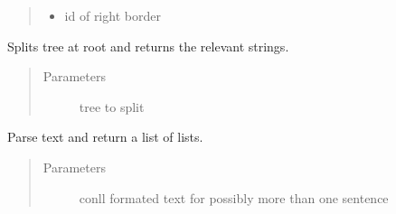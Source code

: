 \documentclass[letterpaper,10pt,english]{sphinxmanual}
\begin{document}
\begin{fulllineitems}
\begin{fulllineitems}
\begin{quote}
\begin{description}
\begin{itemize}
\item {} 
 \textendash{} id of right border

\end{itemize}

\end{description}\end{quote}

\end{fulllineitems}


\end{fulllineitems}


\begin{fulllineitems}
\label{\detokenize{api:conll_parser.get_relation}}
Splits tree at root and returns the relevant strings.
\begin{quote}\begin{description}
\item[{Parameters}] \leavevmode
{} \textendash{} tree to split

\end{description}\end{quote}

\end{fulllineitems}


\begin{fulllineitems}
\label{\detokenize{api:conll_parser.parse}}
Parse text and return a list of lists.
\begin{quote}\begin{description}
\item[{Parameters}] \leavevmode
{} \textendash{} conll formated text for possibly more than one sentence

\end{description}\end{quote}

\end{fulllineitems}

\end{document}
